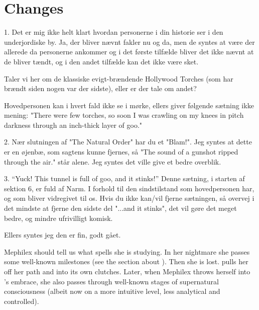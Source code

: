 \section{Changes}
\begin{changes}
    
  \begin{comment}
  \paragraph{Mikkel Kjær Jensen}
  \end{comment}
    1. Det er mig ikke helt klart hvordan personerne i din historie ser i
    den underjordiske by. Ja, der bliver nævnt fakler nu og da, men de
    syntes at være der allerede da personerne ankommer og i det første
    tilfælde bliver det ikke nævnt at de bliver tændt, og i den andet
    tilfælde kan det ikke være sket.

    Taler vi her om de klassiske evigt-brændende Hollywood Torches (som
    har brændt siden nogen var der sidste), eller er der tale om andet?

    Hovedpersonen kan i hvert fald ikke se i mørke, ellers giver følgende
    sætning ikke mening:
    "There were few torches, so soon I was crawling on my knees in
    pitch darkness through an inch-thick layer of goo."

    2. Nær slutningen af "The Natural Order" har du et "Blam!". Jeg syntes
    at dette er en øjenbæ, som sagtens kunne fjernes, så "The sound of a
    gunshot ripped through the air." står alene. Jeg syntes det ville give
    et bedre overblik.

    3. “Yuck! This tunnel is full of goo, and it stinks!”
    Denne sætning, i starten af sektion 6, er fuld af Narm. I forhold til
    den sindstilstand som hovedpersonen har, og som bliver vidregivet til
    os. Hvis du ikke kan/vil fjerne sætningen, så overvej i det mindste at
    fjerne den sidste del "...and it stinks", det vil gøre det meget
    bedre, og mindre ufrivilligt komisk.

    Ellers syntes jeg den er fin, godt gået.
    
  \begin{comment}
  \paragraph{Worldbuilding}
  \end{comment}
    Mephilex should tell us what spells she is studying. 
    In her nightmare she passes some well-known milestones (see the section about ). 
    Then she is lost. 
    \Ubloth pulls her off her path and into its own clutches. 
    Later, when Mephilex throws herself into \Ubloth's embrace, she also passes through well-known stages of supernatural consciousness (albeit now on a more intuitive level, less analytical and controlled). 
  

\end{changes}
